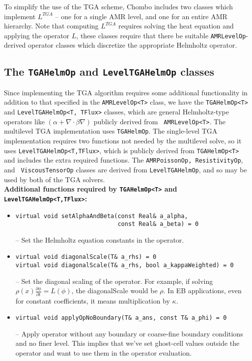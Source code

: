 
To simplify the use of the TGA scheme, Chombo includes two classes which
implement $L^{TGA}$ -- one for a single AMR level, and one for an
entire AMR hierarchy.  Note that computing $L^{TGA}$ requires solving the
heat equation and applying the operator $L$, these classes require
that there be suitable {\tt AMRLevelOp}-derived operator classes which
discretize the appropriate Helmholtz operator. 

\subsection{The {\tt TGAHelmOp} and {\tt LevelTGAHelmOp} classes}
Since implementing the TGA algorithm requires some additional
functionality in addition to that specified in the {\tt AMRLevelOp<T>}
class, we have the {\tt TGAHelmOp<T>} and {\tt LevelTGAHelmOp<T,
  TFlux>} classes, which are general Helmholtz-type operators like
$(\alpha + \nabla \cdot \beta \nabla)$  publicly derived from {\tt
  AMRLevelOp<T>}.  
 The multilevel TGA implementation uses {\tt TGAHelmOp}.  The
 single-level TGA implementation requires two functions not needed by
 the multilevel solve, so it uses {\tt LevelTGAHelmOp<T,TFlux>}, which is
 publicly derived from {\tt TGAHelmOp<T>} and includes the extra required
 functions. The {\tt AMRPoissonOp, ResistivityOp}, and {\tt
   ViscousTensorOp} classes are derived from {\tt LevelTGAHelmOp}, and
 so may be used by both of the TGA solvers. \\
{\bf Additional functions required by {\tt TGAHelmOp<T>} and {\tt LevelTGAHelmOp<T,TFlux>}: }
\begin{itemize}
\item
\begin{verbatim}
virtual void setAlphaAndBeta(const Real& a_alpha,
                             const Real& a_beta) = 0
\end{verbatim}
-- Set the Helmholtz equation constants in the operator.

\item
\begin{verbatim}
virtual void diagonalScale(T& a_rhs) = 0
virtual void diagonalScale(T& a_rhs, bool a_kappaWeighted) = 0
\end{verbatim}
-- Set the diagonal scaling of the operator.  For example, if solving
$\rho(x) \frac{\partial \phi}{\partial t} = L(\phi)$, the diagonalScale
would be $\rho$. In EB applications, even for constant coefficients,
it means multiplication by $\kappa$.  

\item
\begin{verbatim}
virtual void applyOpNoBoundary(T& a_ans, const T& a_phi) = 0
\end{verbatim}
-- Apply operator without any boundary or coarse-fine boundary conditions
and no finer level. This implies that we've set ghost-cell values
outside the operator and want to use them in the operator evaluation. 

\end{itemize}

